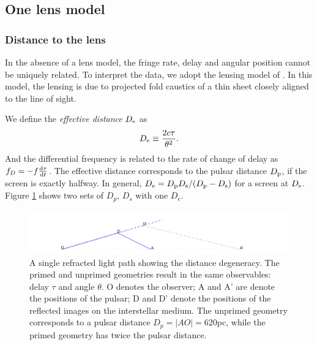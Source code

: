 \documentclass[useAMS,usenatbib]{mn2e}
\begin{document}
\subsection{One lens model}
\subsubsection{Distance to the lens}
In the absence of a lens model, the
fringe rate, delay and angular position cannot be uniquely related. To interpret the data, we adopt the lensing model of
\citep{2014MNRAS.442.3338P}.  In this model, the lensing is due to projected fold caustics of a thin sheet closely aligned to the line of sight. 




We define the {\it effective distance} $D_{\rm e}$ as
\begin{equation}
D_{\rm e} \equiv \frac{2c\tau}{\theta^2}.
\end{equation}
And the differential frequency is related to the rate of change of delay
as $f_D  =-f\frac{\rm d\tau}{\operatorname{d \!} t}$.  The effective distance
corresponds to the pulsar distance $D_{\rm p}$, if the screen is exactly halfway.
In general, $D_{\rm e}={D_{\rm p} D_{\rm s}}/({D_{\rm p} - D_{\rm
    s}})$ for a screen at $D_{\rm s}$. Figure \ref{fig:Singledegeneracy} shows two sets of $D_p$, $D_s$ with one $D_e$.

\begin{figure}
\centering
\includegraphics[width=1.0\linewidth, angle=0]{single_degeneracy.png}
\caption{A single refracted light path showing the distance
  degeneracy.  The primed and unprimed geometries result in the same
  observables: delay $\tau$ and angle $\theta$.
O denotes the observer; A and A' are denote the positions of the
pulsar; D and D' denote the positions of the reflected images on the
interstellar medium. The unprimed geometry corresponds to a pulsar
distance $D_p = |AO| = 620$pc, while the primed geometry has twice the
pulsar distance.}
\label{fig:Singledegeneracy}
\end{figure}
\end{document}

